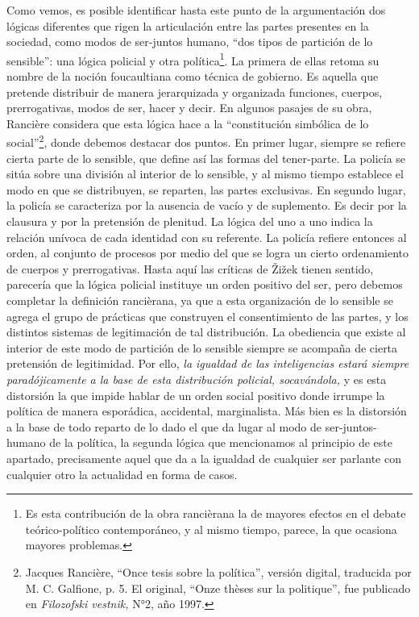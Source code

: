 Como vemos, es posible identificar hasta este punto de la argumentación dos lógicas diferentes que rigen la articulación entre las partes presentes en la sociedad, como modos de ser-juntos humano, \enquote{dos tipos de partición de lo sensible}: una lógica policial y otra política\footnote{Es esta contribución de la obra rancièrana la de mayores efectos en el debate teórico-político contemporáneo, y al mismo tiempo, parece, la que ocasiona mayores problemas.}. La primera de ellas retoma su nombre de la noción foucaultiana como técnica de gobierno. Es aquella que pretende distribuir de manera jerarquizada y organizada funciones, cuerpos, prerrogativas, modos de ser, hacer y decir. En algunos pasajes de su obra, Rancière considera que esta lógica hace a la \enquote{constitución simbólica de lo social}\footnote{Jacques Rancière, \enquote{Once tesis sobre la política}, versión digital, traducida por M. C. Galfione, p. 5. El original, \enquote{Onze thèses sur la politique}, fue publicado en \emph{Filozofski vestnik,} N°2, año 1997.}, donde debemos destacar dos puntos. En primer lugar, siempre se refiere cierta parte de lo sensible, que define así las formas del tener-parte. La policía se sitúa sobre una división al interior de lo sensible, y al mismo tiempo establece el modo en que se distribuyen, se reparten, las partes exclusivas. En segundo lugar, la policía se caracteriza por la ausencia de vacío y de suplemento. Es decir por la clausura y por la pretensión de plenitud. La lógica del uno a uno indica la relación unívoca de cada identidad con su referente. La policía refiere entonces al orden, al conjunto de procesos por medio del que se logra un cierto ordenamiento de cuerpos y prerrogativas. Hasta aquí las críticas de Žižek tienen sentido, parecería que la lógica policial instituye un orden positivo del ser, pero debemos completar la definición rancièrana, ya que a esta organización de lo sensible se agrega el grupo de prácticas que construyen el consentimiento de las partes, y los distintos sistemas de legitimación de tal distribución. La obediencia que existe al interior de este modo de partición de lo sensible siempre se acompaña de cierta pretensión de legitimidad. Por ello, \emph{la igualdad de las inteligencias estará siempre paradójicamente a la base de esta distribución policial, socavándola,} y es esta distorsión la que impide hablar de un orden social positivo donde irrumpe la política de manera esporádica, accidental, marginalista. Más bien es la distorsión a la base de todo reparto de lo dado el que da lugar al modo de ser-juntos-humano de la política, la segunda lógica que mencionamos al principio de este apartado, precisamente aquel que da a la igualdad de cualquier ser parlante con cualquier otro la actualidad en forma de casos.


